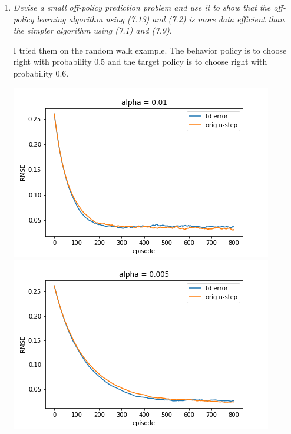 \documentclass[12pt,a4paper]{article}
\begin{document}
\begin{enumerate}
  \item
    \textit{Devise a small off-policy prediction problem and use it to show that
    the off-policy learning algorithm using (7.13) and (7.2) is more data efficient
    than the simpler algorithm using (7.1) and (7.9).}

    I tried them on the random walk example. The behavior policy is to choose right
    with probability $0.5$ and the target policy is to choose right with probability
    $0.6$.

    \begin{center}
    \includegraphics[scale=0.45]{0.01}
    \includegraphics[scale=0.45]{0.005}
    \end{center}

\end{enumerate}
\end{document}
